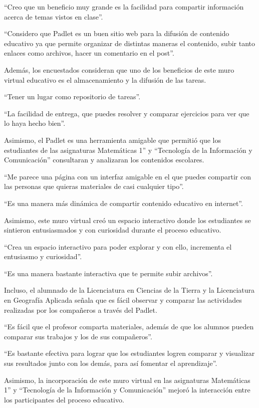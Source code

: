 \documentclass[spanish]{textolivre}
\begin{document}
“Creo que un beneficio muy grande es la facilidad para compartir información acerca de temas vistos en clase”.

“Considero que Padlet es un buen sitio web para la difusión de contenido educativo ya que permite organizar de distintas maneras el contenido, subir tanto enlaces como archivos, hacer un comentario en el post”.

Además, los encuestados consideran que uno de los beneficios de este muro virtual educativo es el almacenamiento y la difusión de las tareas.

“Tener un lugar como repositorio de tareas”.

“La facilidad de entrega, que puedes resolver y comparar ejercicios para ver que lo haya hecho bien”.

Asimismo, el Padlet es una herramienta amigable que permitió que los estudiantes de las asignaturas Matemáticas 1” y “Tecnología de la Información y Comunicación” consultaran y analizaran los contenidos escolares.

“Me parece una página con un interfaz amigable en el que puedes compartir con las personas que quieras materiales de casi cualquier tipo”.

“Es una manera más dinámica de compartir contenido educativo en internet”.

Asimismo, este muro virtual creó un espacio interactivo donde los estudiantes se sintieron entusiasmados y con curiosidad durante el proceso educativo.

“Crea un espacio interactivo para poder explorar y con ello, incrementa el entusiasmo y curiosidad”.

“Es una manera bastante interactiva que te permite subir archivos”.

Incluso, el alumnado de la Licenciatura en Ciencias de la Tierra y la Licenciatura en Geografía Aplicada señala que es fácil observar y comparar las actividades realizadas por los compañeros a través del Padlet.

“Es fácil que el profesor comparta materiales, además de que los alumnos pueden comparar sus trabajos y los de sus compañeros”.

“Es bastante efectiva para lograr que los estudiantes logren comparar y visualizar sus resultados junto con los demás, para así fomentar el aprendizaje”.

Asimismo, la incorporación de este muro virtual en las asignaturas Matemáticas 1” y “Tecnología de la Información y Comunicación” mejoró la interacción entre los participantes del proceso educativo.
\end{document}

